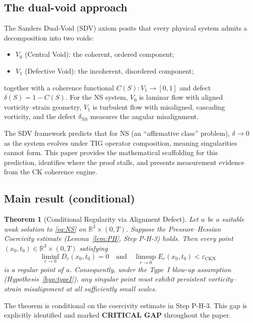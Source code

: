\documentclass[11pt]{article}
\newtheorem{theorem}{Theorem}[section]
\theoremstyle{definition}
\theoremstyle{remark}
\newcommand{\R}{\mathbb{R}}
\newcommand{\eps}{\varepsilon}
\begin{document}
\subsection{The dual-void approach}

The Sanders Dual-Void (SDV) axiom posits that every physical system admits a
decomposition into two voids:
\begin{itemize}[nosep]
  \item $V_0$ (Central Void): the coherent, ordered component;
  \item $V_1$ (Defective Void): the incoherent, disordered component;
\end{itemize}
together with a coherence functional $C(S): V_1 \to [0,1]$ and defect
$\delta(S) = 1 - C(S)$.  For the NS system, $V_0$ is laminar flow with aligned
vorticity--strain geometry, $V_1$ is turbulent flow with misaligned, cascading
vorticity, and the defect $\delta_{\mathrm{NS}}$ measures the angular misalignment.

The SDV framework predicts that for NS (an ``affirmative class'' problem),
$\delta \to 0$ as the system evolves under TIG operator composition, meaning
singularities cannot form.  This paper provides the mathematical scaffolding
for this prediction, identifies where the proof stalls, and presents measurement
evidence from the CK coherence engine.

\subsection{Main result (conditional)}

\begin{theorem}[Conditional Regularity via Alignment Defect]
\label{thm:main}
Let $u$ be a suitable weak solution to \eqref{eq:NS} on $\R^3 \times (0,T)$.
Suppose the Pressure--Hessian Coercivity estimate (Lemma~\ref{lem:PH}, Step P-H-3)
holds.  Then every point $(x_0, t_0) \in \R^3 \times (0,T)$ satisfying
\[
  \liminf_{r\to 0} D_r(x_0, t_0) = 0
  \quad\text{and}\quad
  \limsup_{r\to 0} E_r(x_0, t_0) < \eps_{\mathrm{CKN}}
\]
is a regular point of $u$.  Consequently, under the Type~I blow-up assumption
(Hypothesis~\ref{hyp:typeI}), any singular point must exhibit persistent
vorticity--strain misalignment at all sufficiently small scales.
\end{theorem}

The theorem is conditional on the coercivity estimate in Step P-H-3.  This gap is
explicitly identified and marked \textbf{CRITICAL GAP} throughout the paper.
\end{document}
